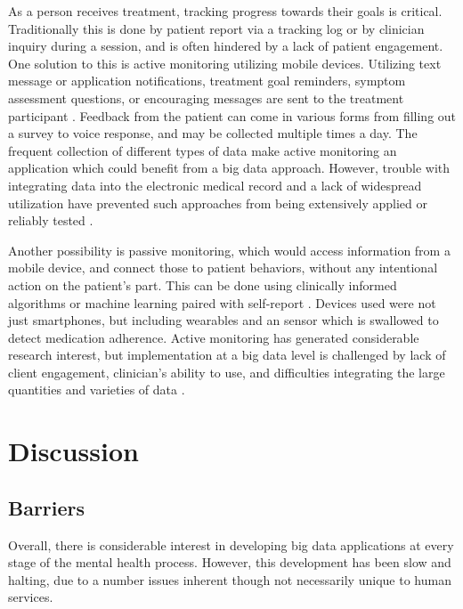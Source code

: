 \documentclass[sigconf]{acmart}
\begin{document}
As a person receives treatment, tracking progress towards their goals is critical. Traditionally this is done by patient report via a tracking log or by clinician inquiry during a session, and is often hindered by a lack of patient engagement. One solution to this is active monitoring utilizing mobile devices. Utilizing text message or application notifications, treatment goal reminders, symptom assessment questions, or encouraging messages are sent to the treatment participant \cite{bitreview}. Feedback from the patient can come in various forms from filling out a survey  to voice response, and may be collected multiple times a day. The frequent collection of different types of data make active monitoring an application which could benefit from a big data approach. However, trouble with integrating data into the electronic medical record and a lack of widespread utilization have prevented such approaches from being extensively applied or reliably tested \cite{bigdatabipolar}.

Another possibility is passive monitoring, which would access information from a mobile device, and connect those to patient behaviors, without any intentional action on the patient's part. This can be done using clinically informed algorithms or machine learning paired with self-report \cite{bitreview}. Devices used were not just smartphones, but including wearables and an sensor which is swallowed to detect medication adherence. Active monitoring has generated considerable research interest, but implementation at a big data level is challenged by lack of client engagement, clinician's ability to use, and difficulties integrating the large quantities and varieties of data \cite{bigdatabipolar}. 

\section{Discussion}

\subsection{Barriers}

Overall, there is considerable interest in developing big data applications at every stage of the mental health process. However, this development has been slow and halting, due to a number issues inherent though not necessarily unique to human services. 
\end{document}
